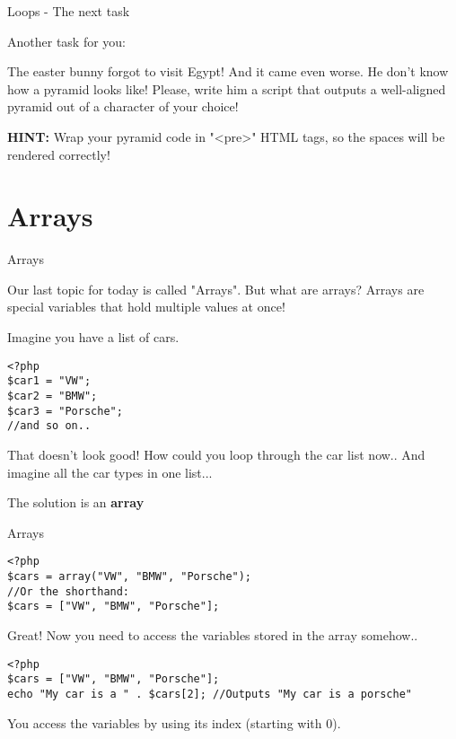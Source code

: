 \begin{frame}[fragile]{Loops - The next task}

Another task for you:

The easter bunny forgot to visit Egypt! And it came even worse. He don't know how a pyramid looks like! Please, write him a script that outputs a well-aligned pyramid out of a character of your choice! \pause

\textbf{HINT:} Wrap your pyramid code in "<pre>" HTML tags, so the spaces will be rendered correctly!

\end{frame}

\section{Arrays}

\begin{frame}[fragile]{Arrays}

Our last topic for today is called "Arrays". But what are arrays? \pause
Arrays are special variables that hold multiple values at once!

Imagine you have a list of cars.
\begin{lstlisting}
<?php
$car1 = "VW";
$car2 = "BMW";
$car3 = "Porsche";
//and so on..
\end{lstlisting} \pause

That doesn't look good! How could you loop through the car list now.. And imagine all the car types in one list... \pause

The solution is an \textbf{array}

\end{frame}


\begin{frame}[fragile]{Arrays}

\begin{lstlisting}
<?php
$cars = array("VW", "BMW", "Porsche");
//Or the shorthand:
$cars = ["VW", "BMW", "Porsche"];
\end{lstlisting} \pause
Great! Now you need to access the variables stored in the array somehow.. \pause

\begin{lstlisting}
<?php
$cars = ["VW", "BMW", "Porsche"];
echo "My car is a " . $cars[2]; //Outputs "My car is a porsche"
\end{lstlisting} \pause

You access the variables by using its index (starting with 0).

\end{frame}

